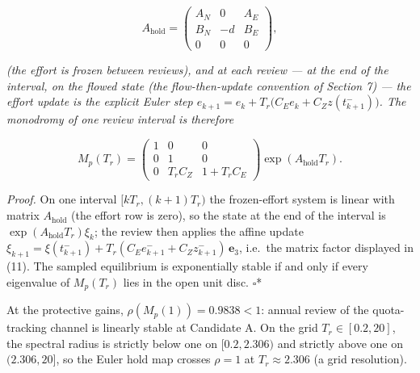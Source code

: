 \documentclass[11pt]{article}
\begin{document}
\[A_{\mathrm{hold}} = \begin{pmatrix} A_N & 0 & A_E \\ B_N & -d & B_E \\ 0 & 0 & 0 \end{pmatrix},\]

\emph{(the effort is frozen between reviews), and at each review --- at
the end of the interval, on the flowed state (the flow-then-update
convention of Section 7) --- the effort update is the explicit Euler
step \(e_{k+1} = e_k + T_r\big(C_E e_k + C_Z z(t_{k+1}^-)\big)\). The
monodromy of one review interval is therefore}

\[M_p(T_r) = \begin{pmatrix} 1 & 0 & 0 \\ 0 & 1 & 0 \\ 0 & T_r C_Z & 1 + T_r C_E \end{pmatrix} \exp(A_{\mathrm{hold}} T_r). \tag{11}\]

\emph{Proof.} On one interval \([kT_r, (k+1)T_r)\) the frozen-effort
system is linear with matrix \(A_{\mathrm{hold}}\) (the effort row is
zero), so the state at the end of the interval is
\(\exp(A_{\mathrm{hold}}T_r)\xi_k\); the review then applies the affine
update
\(\xi_{k+1} = \xi(t_{k+1}^-) + T_r(C_E e_{k+1}^- + C_Z z_{k+1}^-)\,\mathbf{e}_3\),
i.e.~the matrix factor displayed in (11). The sampled equilibrium is
exponentially stable if and only if every eigenvalue of \(M_p(T_r)\)
lies in the open unit disc. \ensuremath{\square}*

At the protective gains, \(\rho(M_p(1)) = 0.9838 < 1\): annual review of
the quota-tracking channel is linearly stable at Candidate A. On the
grid \(T_r \in [0.2, 20]\), the spectral radius is strictly below one on
\([0.2, 2.306)\) and strictly above one on \((2.306, 20]\), so the Euler
hold map crosses \(\rho = 1\) at \(T_r \approx 2.306\) (a grid
resolution).
\end{document}
